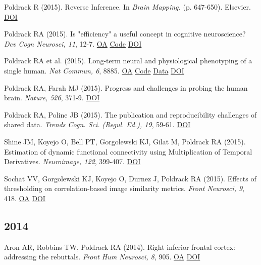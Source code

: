 Poldrack R (2015). Reverse Inference. In \textit{Brain Mapping.} (p. 647-650). Elsevier. \href{http://dx.doi.org/10.1016/b978-0-12-397025-1.00346-8}{DOI} \vspace{2mm}

Poldrack RA (2015). Is "efficiency" a useful concept in cognitive neuroscience? \textit{Dev Cogn Neurosci, 11}, 12-7. \href{https://www.ncbi.nlm.nih.gov/pmc/articles/PMC6989750}{OA} \href{https://github.com/poldrack/rtmodel}{Code} \href{http://dx.doi.org/10.1016/j.dcn.2014.06.001}{DOI} \vspace{2mm}

Poldrack RA et al. (2015). Long-term neural and physiological phenotyping of a single human. \textit{Nat Commun, 6}, 8885. \href{https://www.ncbi.nlm.nih.gov/pmc/articles/PMC4682164}{OA} \href{https://github.com/poldrack/myconnectome}{Code} \href{https://openneuro.org/datasets/ds000031/versions/00001}{Data} \href{http://dx.doi.org/10.1038/ncomms9885}{DOI} \vspace{2mm}

Poldrack RA, Farah MJ (2015). Progress and challenges in probing the human brain. \textit{Nature, 526}, 371-9. \href{http://dx.doi.org/10.1038/nature15692}{DOI} \vspace{2mm}

Poldrack RA, Poline JB (2015). The publication and reproducibility challenges of shared data. \textit{Trends Cogn. Sci. (Regul. Ed.), 19}, 59-61. \href{http://dx.doi.org/10.1016/j.tics.2014.11.008}{DOI} \vspace{2mm}

Shine JM, Koyejo O, Bell PT, Gorgolewski KJ, Gilat M, Poldrack RA (2015). Estimation of dynamic functional connectivity using Multiplication of Temporal Derivatives. \textit{Neuroimage, 122}, 399-407. \href{http://dx.doi.org/10.1016/j.neuroimage.2015.07.064}{DOI} \vspace{2mm}

Sochat VV, Gorgolewski KJ, Koyejo O, Durnez J, Poldrack RA (2015). Effects of thresholding on correlation-based image similarity metrics. \textit{Front Neurosci, 9}, 418. \href{https://www.ncbi.nlm.nih.gov/pmc/articles/PMC4625081}{OA} \href{http://dx.doi.org/10.3389/fnins.2015.00418}{DOI} \vspace{2mm}

\subsection*{2014}

Aron AR, Robbins TW, Poldrack RA (2014). Right inferior frontal cortex: addressing the rebuttals. \textit{Front Hum Neurosci, 8}, 905. \href{https://www.ncbi.nlm.nih.gov/pmc/articles/PMC4227507}{OA} \href{http://dx.doi.org/10.3389/fnhum.2014.00905}{DOI} \vspace{2mm}

